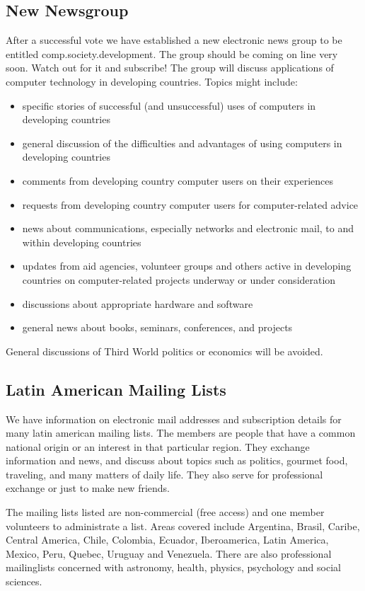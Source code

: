 \subsection{New Newsgroup}
After a successful vote we have established a new electronic news
group to be entitled comp.society.development. The group should be
coming on line very soon. Watch out for it and subscribe! 
The group will discuss applications of computer technology
in developing countries.  Topics might include: 
\begin{itemize}
\item specific stories of successful (and unsuccessful) uses of computers
    in developing countries
 \item  general discussion of the difficulties and advantages of using
    computers in developing countries
 \item  comments from developing country computer users on their experiences
 \item  requests from developing country computer users for computer-related
    advice
 \item  news about communications, especially networks and electronic mail,
    to and within developing countries
 \item  updates from aid agencies, volunteer groups and others active in
    developing countries on computer-related projects underway or under
    consideration
 \item  discussions about appropriate hardware and software
 \item  general news about books, seminars, conferences, and projects
\end{itemize}
General discussions of Third World politics or economics will be avoided.

\subsection{Latin American Mailing Lists}
We have information on electronic mail addresses and subscription
details for many latin american mailing lists. The members are people
that have a common national origin or an interest in that particular
region. They exchange information and news, and discuss about topics
such as politics, gourmet food, traveling, and many matters of daily
life. They also serve for professional exchange or just to make new
friends. 

The mailing lists listed are non-commercial (free access) and one
member volunteers to administrate a list. Areas covered include
Argentina, Brasil, Caribe, Central America, Chile, Colombia, Ecuador,
Iberoamerica, Latin America, Mexico, Peru, Quebec, Uruguay and
Venezuela. There are also professional mailinglists concerned with
astronomy, health, physics, psychology and  social sciences. 

